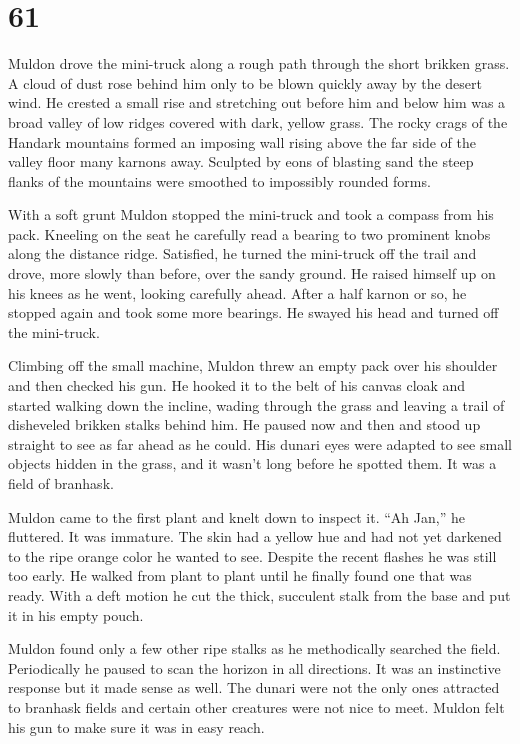 
\chapter{61}

Muldon drove the mini-truck along a rough path through the short brikken grass. A cloud of dust
rose behind him only to be blown quickly away by the desert wind. He crested a small rise and
stretching out before him and below him was a broad valley of low ridges covered with dark,
yellow grass. The rocky crags of the Handark mountains formed an imposing wall rising above the
far side of the valley floor many karnons away. Sculpted by eons of blasting sand the steep
flanks of the mountains were smoothed to impossibly rounded forms.

With a soft grunt Muldon stopped the mini-truck and took a compass from his pack.  Kneeling on
the seat he carefully read a bearing to two prominent knobs along the distance ridge. Satisfied,
he turned the mini-truck off the trail and drove, more slowly than before, over the sandy
ground. He raised himself up on his knees as he went, looking carefully ahead.  After a half
karnon or so, he stopped again and took some more bearings.  He swayed his head and turned off
the mini-truck.

Climbing off the small machine, Muldon threw an empty pack over his shoulder and then checked
his gun. He hooked it to the belt of his canvas cloak and started walking down the incline,
wading through the grass and leaving a trail of disheveled brikken stalks behind him. He paused
now and then and stood up straight to see as far ahead as he could. His dunari eyes were adapted
to see small objects hidden in the grass, and it wasn't long before he spotted them. It was a
field of branhask.

Muldon came to the first plant and knelt down to inspect it. ``Ah Jan,'' he fluttered. It was
immature. The skin had a yellow hue and had not yet darkened to the ripe orange color he wanted
to see. Despite the recent flashes he was still too early. He walked from plant to plant until
he finally found one that was ready. With a deft motion he cut the thick, succulent stalk from
the base and put it in his empty pouch.

Muldon found only a few other ripe stalks as he methodically searched the field. Periodically he
paused to scan the horizon in all directions. It was an instinctive response but it made sense
as well. The dunari were not the only ones attracted to branhask fields and certain other
creatures were not nice to meet. Muldon felt his gun to make sure it was in easy reach.

